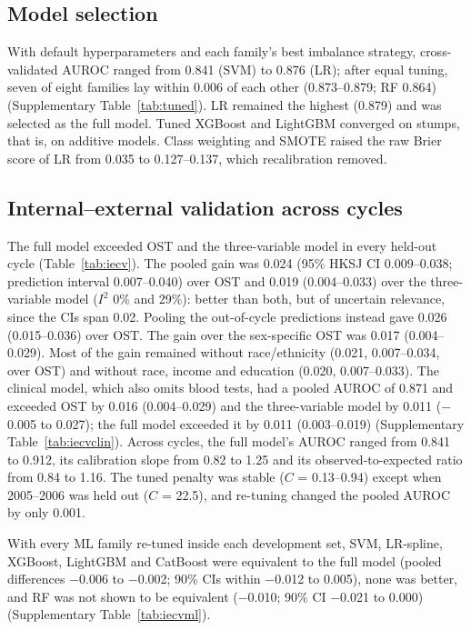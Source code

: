 \documentclass[11pt,a4paper]{article}
\begin{document}
\subsection{Model selection}
With default hyperparameters and each family's best imbalance strategy, cross-validated AUROC ranged from 0.841 (SVM) to 0.876 (LR); after equal tuning, seven of eight families lay within 0.006 of each other (0.873--0.879; RF 0.864) (Supplementary Table~\ref{tab:tuned}). LR remained the highest (0.879) and was selected as the full model. Tuned XGBoost and LightGBM converged on stumps, that is, on additive models. Class weighting and SMOTE raised the raw Brier score of LR from 0.035 to 0.127--0.137, which recalibration removed.

\subsection{Internal--external validation across cycles}
The full model exceeded OST and the three-variable model in every held-out cycle (Table~\ref{tab:iecv}). The pooled gain was 0.024 (95\% HKSJ CI 0.009--0.038; prediction interval 0.007--0.040) over OST and 0.019 (0.004--0.033) over the three-variable model ($I^2$ 0\% and 29\%): better than both, but of uncertain relevance, since the CIs span 0.02. Pooling the out-of-cycle predictions instead gave 0.026 (0.015--0.036) over OST. The gain over the sex-specific OST was 0.017 (0.004--0.029). Most of the gain remained without race/ethnicity (0.021, 0.007--0.034, over OST) and without race, income and education (0.020, 0.007--0.033). The clinical model, which also omits blood tests, had a pooled AUROC of 0.871 and exceeded OST by 0.016 (0.004--0.029) and the three-variable model by 0.011 ($-$0.005 to 0.027); the full model exceeded it by 0.011 (0.003--0.019) (Supplementary Table~\ref{tab:iecvclin}). Across cycles, the full model's AUROC ranged from 0.841 to 0.912, its calibration slope from 0.82 to 1.25 and its observed-to-expected ratio from 0.84 to 1.16. The tuned penalty was stable ($C$ = 0.13--0.94) except when 2005--2006 was held out ($C$ = 22.5), and re-tuning changed the pooled AUROC by only 0.001.

With every ML family re-tuned inside each development set, SVM, LR-spline, XGBoost, LightGBM and CatBoost were equivalent to the full model (pooled differences $-$0.006 to $-$0.002; 90\% CIs within $-$0.012 to 0.005), none was better, and RF was not shown to be equivalent ($-$0.010; 90\% CI $-$0.021 to 0.000) (Supplementary Table~\ref{tab:iecvml}).
\end{document}
